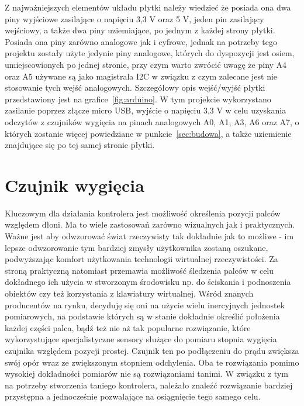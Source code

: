 	Z najważniejszych elementów układu płytki należy wiedzieć że posiada ona dwa piny wyjściowe zasilające o napięciu 3,3 V oraz 5 V, jeden pin zasilający wejściowy, a także dwa piny uziemiające, po jednym z każdej strony płytki. Posiada ona piny zarówno analogowe jak i cyfrowe, jednak na potrzeby tego projektu zostały użyte jedynie piny analogowe, których do dyspozycji jest osiem, umiejscowionych po jednej stronie, przy czym warto zwrócić uwagę że piny A4 oraz A5 używane są jako magistrala I2C w związku z czym zalecane jest nie stosowanie tych wejść analogowych. Szczegółowy opis wejść/wyjść płytki przedstawiony jest na grafice~\ref{fig:arduino}. W tym projekcie wykorzystano zasilanie poprzez złącze micro USB, wyjście o napięciu 3,3 V w celu uzyskania odczytów z czujników wygięcia na pinach analogowych A0, A1, A3, A6 oraz A7, o których zostanie więcej powiedziane w punkcie~\ref{sec:budowa}, a także uziemienie znajdujące się po tej samej stronie płytki.

	\section{Czujnik wygięcia}
	\label{sec:wygiecie}	
	Kluczowym dla działania kontrolera jest możliwość określenia pozycji palców względem dłoni. Ma to wiele zastosowań zarówno wizualnych jak i praktycznych. Ważne jest aby odwzorować świat rzeczywisty tak dokładnie jak to możliwe - im lepsze odwzorowanie tym bardziej zmysły użytkownika zostaną oszukane, podwyższając komfort użytkowania technologii wirtualnej rzeczywistości. Za stroną praktyczną natomiast przemawia możliwość śledzenia palców w celu dokładnego ich użycia w stworzonym środowisku np. do ściskania i podnoszenia obiektów czy też korzystania z klawiatury wirtualnej. Wśród znanych producentów na rynku, decyduję się oni na użycie wielu inercyjnych jednostek pomiarowych, na podstawie których są w stanie dokładnie określić położenia każdej części palca, bądź też nie aż tak popularne rozwiązanie, które wykorzystujące specjalistyczne sensory służące do pomiaru stopnia wygięcia czujnika względem pozycji prostej. Czujnik ten po podłączeniu do prądu zwiększa swój opór wraz ze zwiększonym stopniem odchylenia. Oba te rozwiązania pomimo wysokiej dokładności pomiarów nie są rozwiązaniami tanimi. W związku z tym na potrzeby stworzenia taniego kontrolera, należało znaleźć rozwiązanie bardziej przystępna a jednocześnie pozwalające na osiągnięcie tego samego celu.
	
